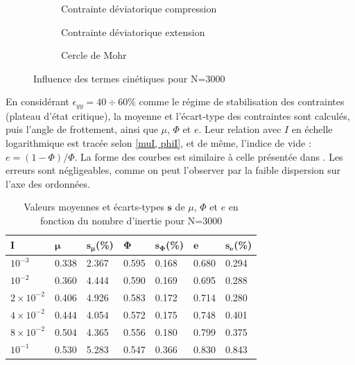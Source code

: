 \documentclass[5p,authoryear,square]{elsarticle}
\begin{document}
\begin{figure}[htbp]
    \centering
    \begin{subfigure}[b]{0.45\textwidth}
        \centering
        \scalebox{0.5}{}
        \caption{Contrainte déviatorique compression}
        \label{3000_comp}
    \end{subfigure}
    \hfill
    \begin{subfigure}[b]{0.45\textwidth}
        \centering
        \scalebox{0.5}{}
        \caption{Contrainte déviatorique extension}
        \label{3000_ext}
    \end{subfigure}
    
    \begin{subfigure}[b]{0.45\textwidth}
        \centering
        \scalebox{0.5}{}
        \caption{Cercle de Mohr}
        \label{300_cercle}
    \end{subfigure}
    \caption{Influence des termes cinétiques pour N=3000}
    \label{3000_Mohr}
\end{figure}

En considérant $\epsilon_{yy} = 40 \div 60\%$ comme le régime de stabilisation des contraintes (plateau d'état critique), la moyenne et l'écart-type des contraintes sont calculés, puis l'angle de frottement, ainsi que $\mu$, $\Phi$ et $e$.
Leur relation avec $I$ en échelle logarithmique est tracée selon \cref{muI, phiI}, et de même, l'indice de vide : $e = (1-\Phi)/\Phi$.
La forme des courbes est similaire à celle présentée dans \citep{da2005rheophysics}.
Les erreurs sont négligeables, comme on peut l'observer par la faible dispersion sur l'axe des ordonnées.

\begin{table}[htbp]
\centering
\small
\begin{tabular}{@{}lllllll@{}}
\toprule
\textbf{I} & $\boldsymbol{\mu}$ & $\boldsymbol{s_{\mu}}$(\%) & $\boldsymbol{\Phi}$ & $\boldsymbol{s_{\Phi}}$(\%) & $\boldsymbol{e}$ & $\boldsymbol{s_{e}}$(\%) \\
\midrule
$10^{-3}$ & 0.338 & 2.367 & 0.595 & 0.168 & 0.680 & 0.294 \\
$10^{-2}$ & 0.360 & 4.444 & 0.590 & 0.169 & 0.695 & 0.288 \\
$2 \times 10^{-2}$ & 0.406 & 4.926 & 0.583 & 0.172 & 0.714 & 0.280 \\
$4 \times 10^{-2}$ & 0.444 & 4.054 & 0.572 & 0.175 & 0.748 & 0.401 \\
$8 \times 10^{-2}$ & 0.504 & 4.365 & 0.556 & 0.180 & 0.799 & 0.375 \\
$10^{-1}$ & 0.530 & 5.283 & 0.547 & 0.366 & 0.830 & 0.843 \\
\bottomrule
\end{tabular}
\caption{Valeurs moyennes et écarts-types $\boldsymbol{s}$ de $\mu$, $\Phi$ et $e$ en fonction du nombre d'inertie pour N=3000}
\label{table_rheologie_stats}
\end{table}
\end{document}
